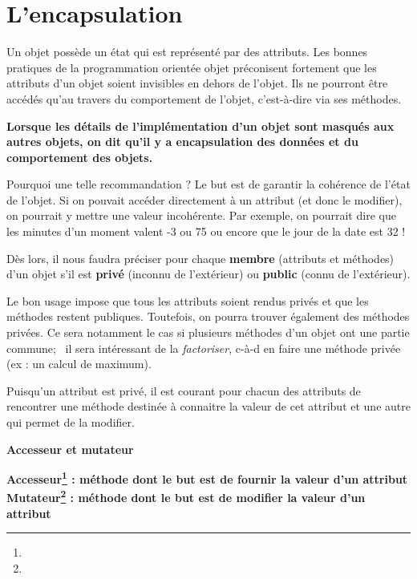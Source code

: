 \bigskip

\section{L'encapsulation}
{
Un objet possède un état qui est représenté par des attributs. Les
bonnes pratiques de la programmation orientée objet préconisent
fortement que les attributs d'un objet soient
invisibles en dehors de l'objet. Ils ne pourront être
accédés qu'au travers du comportement de
l'objet, c'est-à-dire via ses
méthodes.}

{\sffamily\bfseries\upshape
{
Lorsque les détails de l'implémentation
d'un objet sont masqués aux autres objets, on dit
qu'il y a \textbf{encapsulation} des données et du
comportement des objets.}}

{
Pourquoi une telle recommandation ? Le but est de garantir la cohérence
de l'état de l'objet. Si on pouvait
accéder directement à un attribut (et donc le modifier), on pourrait y
mettre une valeur incohérente. Par exemple, on pourrait dire que les
minutes d'un moment valent -3 ou 75 ou encore que le
jour de la date est 32 !}

{
Dès lors, il nous faudra préciser pour chaque \textbf{membre} (attributs
et méthodes) d'un objet s'il est
\textbf{privé} (inconnu de l'extérieur) ou
\textbf{public} (connu de l'extérieur). }

{
Le bon usage impose que tous les attributs soient rendus privés et que
les méthodes restent publiques. Toutefois, on pourra trouver également
des méthodes privées. Ce sera notamment le cas si plusieurs méthodes
d'un objet ont une partie commune; \ il sera
intéressant de la \textit{factoriser}, c-à-d en faire une méthode
privée (ex : un calcul de maximum).}

{
Puisqu'un attribut est privé, il est courant pour
chacun des attributs de rencontrer une méthode destinée à connaitre la
valeur de cet attribut et une autre qui permet de la modifier.}

{\sffamily\bfseries\upshape
Accesseur et mutateur}

{\sffamily\bfseries\upshape
{
\textbf{Accesseur}\footnote{} : méthode dont le but est de
fournir la valeur d'un attribut
\textbf{Mutateur}\footnote{} : méthode dont le but est de
modifier la valeur d'un attribut}}

